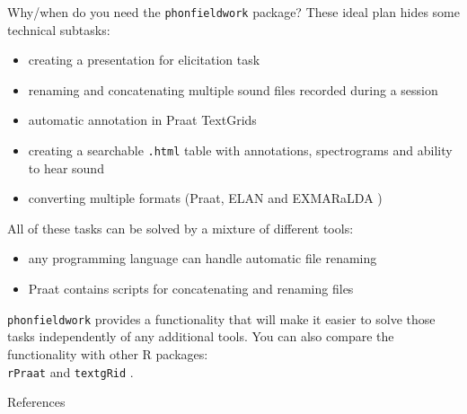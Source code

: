 \documentclass[13pt, t]{beamer}
\begin{document}
\begin{frame}{Why/when do you need the \texttt{phonfieldwork} package?}
These ideal plan hides some technical subtasks:
\begin{itemize}
\item creating a presentation for elicitation task
\item renaming and concatenating multiple sound files recorded during a session
\item automatic annotation in Praat TextGrids {\small \citep{boersma19}}
\item creating a searchable \texttt{.html} table with annotations, spectrograms and ability to hear sound
\item converting multiple formats (Praat, ELAN \citep{brugman04} and EXMARaLDA \citep{schmidt09}) \pause
\end{itemize}
\vfill
All of these tasks can be solved by a mixture of different tools:
\begin{itemize}
\item any programming language can handle automatic  file renaming
\item Praat contains scripts for concatenating and renaming files
\end{itemize}
\pause
\vfill
\texttt{phonfieldwork} provides a functionality that will make it easier to solve those tasks independently of any additional tools. You can also compare the functionality with other R packages:\\ \texttt{rPraat} \citep{borzil16} and \texttt{textgRid} \citep{reidy16}.
\end{frame}

\begin{frame}{References}
\footnotesize


\end{frame}
\end{document}
